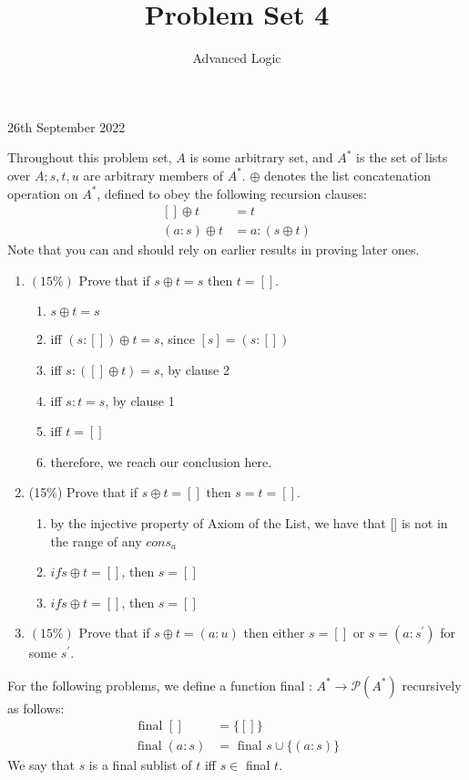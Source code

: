 \documentclass[10pt]{article}
\title{Problem Set 4 }
\author{Advanced Logic}
\date{}
\begin{document}
\maketitle

26th September 2022

Throughout this problem set, $A$ is some arbitrary set, and $A^{*}$ is the set of lists over $A ; s, t, u$ are arbitrary members of $A^{*}$. $\oplus$ denotes the list concatenation operation on $A^{*}$, defined to obey the following recursion clauses:
$$
\begin{aligned}
{[] \oplus t } &=t \\
(a: s) \oplus t &=a:(s \oplus t)
\end{aligned}
$$
Note that you can and should rely on earlier results in proving later ones.

\begin{enumerate}
  \item $(15 \%)$ Prove that if $s \oplus t=s$ then $t=[]$.
    \begin{enumerate}
        \item $s \oplus t = s$
        \item iff $(s:[]) \oplus t = s$, since $[s] = (s:[])$ 
        \item iff $s:([]\oplus t) = s$, by clause 2
        \item iff $s : t = s$, by clause 1
        \item iff $t = []$
        \item therefore, we reach our conclusion here.
    \end{enumerate}
  \item (15\%) Prove that if $s \oplus t=[]$ then $s=t=[]$.
    \begin{enumerate}
        \item by the injective property of Axiom of the List, we have that [] is not in the range of any $cons_{a}$
        \item $if s \oplus t = []$, then $s = []$
        \item $if s \oplus t = []$, then $s = []$
    \end{enumerate}

  \item $(15 \%)$ Prove that if $s \oplus t=(a: u)$ then either $s=[]$ or $s=\left(a: s^{\prime}\right)$ for some $s^{\prime}$.

\end{enumerate}
For the following problems, we define a function final : $A^{*} \rightarrow \mathcal{P}\left(A^{*}\right)$ recursively as follows:
$$
\begin{aligned}
\text { final }[] &=\{[]\} \\
\operatorname{final}(a: s) &=\text { final } s \cup\{(a: s)\}
\end{aligned}
$$
We say that $s$ is a final sublist of $t$ iff $s \in$ final $t$.
\end{document}
